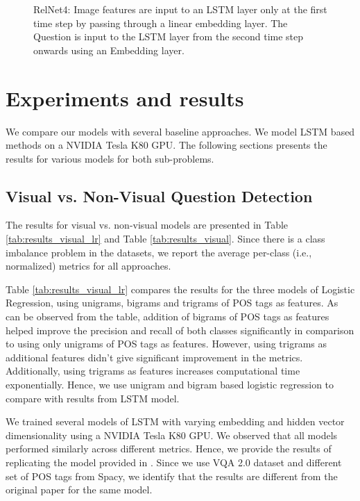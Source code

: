 \begin{enumerate}
\begin{enumerate}
\begin{figure}[t]
\begin{center}
\end{center}
   \caption{RelNet4: Image features are input to an LSTM layer only at the first time step by passing through a linear embedding layer. The Question is input to the LSTM layer from the second time step onwards using an Embedding layer.}
\label{fig:LSTM4}
\end{figure}
\end{enumerate}
\end{enumerate}

\nocite{colah_blog}

\section{Experiments and results}
We compare our models with several baseline approaches. We model LSTM based methods on a NVIDIA Tesla K80 GPU. The following sections presents the results for various models for both sub-problems.

\subsection{Visual vs. Non-Visual Question Detection}
The results for visual vs. non-visual models are presented in Table \ref{tab:results_visual_lr} and Table \ref{tab:results_visual}. Since there is a class imbalance problem in the datasets, we report the average per-class (i.e., normalized) metrics for all approaches.

Table \ref{tab:results_visual_lr} compares the results for the three models of Logistic Regression, using unigrams, bigrams and trigrams of POS tags as features. As can be observed from the table, addition of bigrams of POS tags as features helped improve the precision and recall of both classes significantly in comparison to using only unigrams of POS tags as features. However, using trigrams as additional features didn't give significant improvement in the metrics. Additionally, using trigrams as features increases computational time exponentially. Hence, we use unigram and bigram based logistic regression to compare with results from LSTM model. 

We trained several models of LSTM with varying embedding and hidden vector dimensionality using a NVIDIA Tesla K80 GPU. We observed that all models performed similarly across different metrics. Hence, we provide the results of replicating the model provided in \cite{ray2016question}. Since we use VQA 2.0 dataset \cite{goyal2016making} and different set of POS tags from Spacy, we identify that the results are different from the original paper for the same model.

